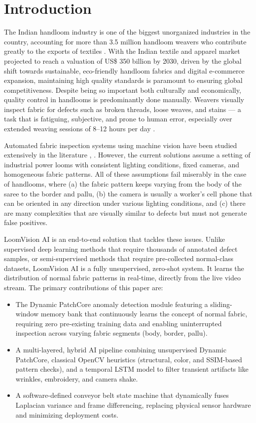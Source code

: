 \documentclass{ieeeaccess}
\begin{document}
\section{Introduction}

The Indian handloom industry is one of the biggest unorganized industries in the country, accounting for more than 3.5 million handloom weavers who contribute greatly to the exports of textiles \cite{b1}. With the Indian textile and apparel market projected to reach a valuation of US\$ 350 billion by 2030, driven by the global shift towards sustainable, eco-friendly handloom fabrics and digital e-commerce expansion, maintaining high quality standards is paramount to ensuring global competitiveness. Despite being so important both culturally and economically, quality control in handlooms is predominantly done manually. Weavers visually inspect fabric for defects such as broken threads, loose weaves, and stains --- a task that is fatiguing, subjective, and prone to human error, especially over extended weaving sessions of 8--12 hours per day \cite{b2}.

Automated fabric inspection systems using machine vision have been studied extensively in the literature \cite{b3}, \cite{b4}. However, the current solutions assume a setting of industrial power looms with consistent lighting conditions, fixed cameras, and homogeneous fabric patterns. All of these assumptions fail miserably in the case of handlooms, where (a) the fabric pattern keeps varying from the body of the saree to the border and pallu, (b) the camera is usually a worker's cell phone that can be oriented in any direction under various lighting conditions, and (c) there are many complexities that are visually similar to defects but must not generate false positives.

LoomVision AI is an end-to-end solution that tackles these issues. Unlike supervised deep learning methods that require thousands of annotated defect samples, or semi-supervised methods that require pre-collected normal-class datasets, LoomVision AI is a fully unsupervised, zero-shot system. It learns the distribution of normal fabric patterns in real-time, directly from the live video stream. The primary contributions of this paper are:
\begin{itemize}
    \item The Dynamic PatchCore anomaly detection module \cite{b14} featuring a sliding-window memory bank that continuously learns the concept of normal fabric, requiring zero pre-existing training data and enabling uninterrupted inspection across varying fabric segments (body, border, pallu).
    \item A multi-layered, hybrid AI pipeline combining unsupervised Dynamic PatchCore, classical OpenCV heuristics (structural, color, and SSIM-based pattern checks), and a temporal LSTM model to filter transient artifacts like wrinkles, embroidery, and camera shake.
    \item A software-defined conveyor belt state machine that dynamically fuses Laplacian variance and frame differencing, replacing physical sensor hardware and minimizing deployment costs.
\end{itemize}
\end{document}
